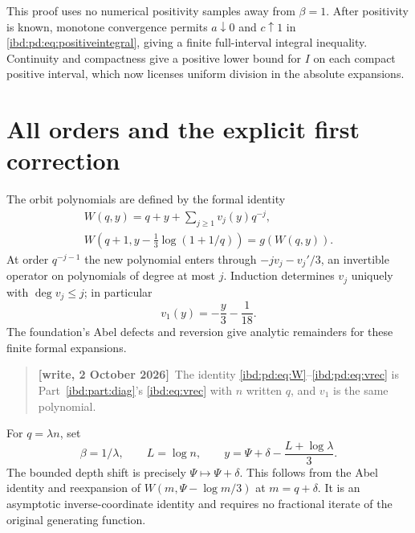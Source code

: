 \documentclass[11pt,letterpaper]{article}
\theoremstyle{remark}\newtheorem{remark}[theorem]{Remark}
\newenvironment{writenote}{\par\smallskip\begin{quote}\small\textbf{[write, 2 October 2026]}\ }{\end{quote}\smallskip}
\begin{document}
This proof uses no numerical positivity samples away from $\beta=1$. After positivity is known, monotone convergence permits $a\downarrow0$ and $c\uparrow1$ in \eqref{ibd:pd:eq:positiveintegral}, giving a finite full-interval integral inequality. Continuity and compactness give a positive lower bound for $I$ on each compact positive interval, which now licenses uniform division in the absolute expansions.

\section{All orders and the explicit first correction}\label{ibd:pd:sec:coefficients}
The orbit polynomials are defined by the formal identity
\begin{gather}\label{ibd:pd:eq:W}
 W(q,y)=q+y+\sum_{j\geq1}v_j(y)q^{-j},\\
 W\left(q+1,y-\tfrac13\log(1+1/q)\right)=g(W(q,y)).\label{ibd:pd:eq:vrec}
\end{gather}
At order $q^{-j-1}$ the new polynomial enters through
$-jv_j-v_j'/3$, an invertible operator on polynomials of degree at most $j$. Induction determines $v_j$ uniquely with $\deg v_j\leq j$; in particular
\[
 v_1(y)=-\frac y3-\frac1{18}.
\]
The foundation's Abel defects and reversion give analytic remainders for these finite formal expansions.
\begin{writenote}The identity \eqref{ibd:pd:eq:W}--\eqref{ibd:pd:eq:vrec} is Part~\ref{ibd:part:diag}'s \eqref{ibd:eq:vrec} with $n$ written $q$, and $v_1$ is the same polynomial.\end{writenote}

For $q=\lambda n$, set
\begin{equation}\label{ibd:pd:eq:shift}
 \beta=1/\lambda,\qquad L=\log n,\qquad
 y=\Psi+\delta-\frac{L+\log\lambda}{3}.
\end{equation}
The bounded depth shift is precisely $\Psi\mapsto\Psi+\delta$. This follows from the Abel identity and reexpansion of $W(m,\Psi-\log m/3)$ at $m=q+\delta$. It is an asymptotic inverse-coordinate identity and requires no fractional iterate of the original generating function.
\end{document}
